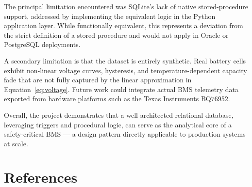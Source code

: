 \documentclass[12pt, a4paper]{report}
\begin{document}
The principal limitation encountered was SQLite's lack of native stored-procedure support, addressed by implementing the equivalent logic in the Python application layer. While functionally equivalent, this represents a deviation from the strict definition of a stored procedure and would not apply in Oracle or PostgreSQL deployments.

A secondary limitation is that the dataset is entirely synthetic. Real battery cells exhibit non-linear voltage curves, hysteresis, and temperature-dependent capacity fade that are not fully captured by the linear approximation in Equation~\ref{eq:voltage}. Future work could integrate actual BMS telemetry data exported from hardware platforms such as the Texas Instruments BQ76952.

Overall, the project demonstrates that a well-architected relational database, leveraging triggers and procedural logic, can serve as the analytical core of a safety-critical BMS — a design pattern directly applicable to production systems at scale.

\newpage

\chapter*{References}
\end{document}
